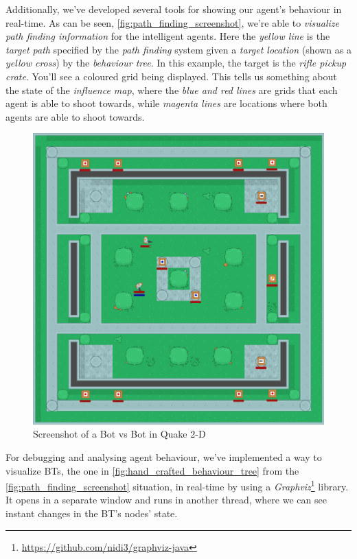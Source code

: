 \documentclass[a4paper, twocolumn]{article}
\begin{document}
        Additionally, we've developed several tools for showing our agent's behaviour in real-time. As can be seen, \cref{fig:path_finding_screenshot}, we're able to \emph{visualize path finding information} for the intelligent agents. Here the \emph{yellow line} is the \emph{target path} specified by the \emph{path finding} system given a \emph{target location} (shown as a \emph{yellow cross}) by the \emph{behaviour tree}. In this example, the target is the \emph{rifle pickup crate}. You'll see a coloured grid being displayed. This tells us something about the state of the \emph{influence map}, where the \emph{blue and red lines} are grids that each agent is able to shoot towards, while \emph{magenta lines} are locations where both agents are able to shoot towards.

        \begin{figure}[H]
            \centering
            \includegraphics[width=\linewidth]{share/screenshot.png}
            \caption{Screenshot of a Bot vs Bot in Quake 2-D}
            \label{fig:behaviour_tree_screenshot}
        \end{figure}

        For debugging and analysing agent behaviour, we've implemented a way to visualize BTs, the one in \cref{fig:hand_crafted_behaviour_tree} from the \cref{fig:path_finding_screenshot} situation, in real-time by using a \emph{Graphviz}\footnote{\url{https://github.com/nidi3/graphviz-java}} library. It opens in a separate window and runs in another thread, where we can see instant changes in the BT's nodes' state.
\end{document}
